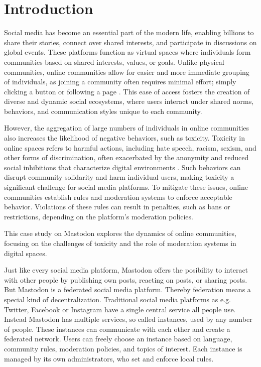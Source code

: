 \chapter{Introduction}\label{introduction}

Social media has become an essential part of the modern life, enabling billions to share their stories, connect over shared interests, and participate in discussions on global events. These platforms function as virtual spaces where individuals form communities based on shared interests, values, or goals. Unlike physical communities, online communities allow for easier and more immediate grouping of individuals, as joining a community often requires minimal effort; simply clicking a button or following a page \citep{ellison:2007}. This ease of access fosters the creation of diverse and dynamic social ecosystems, where users interact under shared norms, behaviors, and communication styles unique to each community.

However, the aggregation of large numbers of individuals in online communities also increases the likelihood of negative behaviors, such as toxicity. Toxicity in online spaces refers to harmful actions, including hate speech, racism, sexism, and other forms of discrimination, often exacerbated by the anonymity and reduced social inhibitions that characterize digital environments \citep{suler:2005}. Such behaviors can disrupt community solidarity and harm individual users, making toxicity a significant challenge for social media platforms. To mitigate these issues, online communities establish rules and moderation systems to enforce acceptable behavior. Violations of these rules can result in penalties, such as bans or restrictions, depending on the platform's moderation policies.

This case study on Mastodon explores the dynamics of online communities, focusing on the challenges of toxicity and the role of moderation systems in digital spaces.

Just like every social media platform, Mastodon offers the posibility to interact with other people by publishing own posts, reacting on posts, or sharing posts. But Mastodon is a federated social media platform. Thereby federation means a special kind of decentralization. Traditional social media platforms as e.g. Twitter, Facebook or Instagram have a single central service all people use. Instead Mastodon has multiple services, so called instances, used by any number of people. These instances can communicate with each other and create a federated network. Users can freely choose an instance based on language, community rules, moderation policies, and topics of interest. Each instance is managed by its own administrators, who set and enforce local rules. \citep{mastodon:docs}

